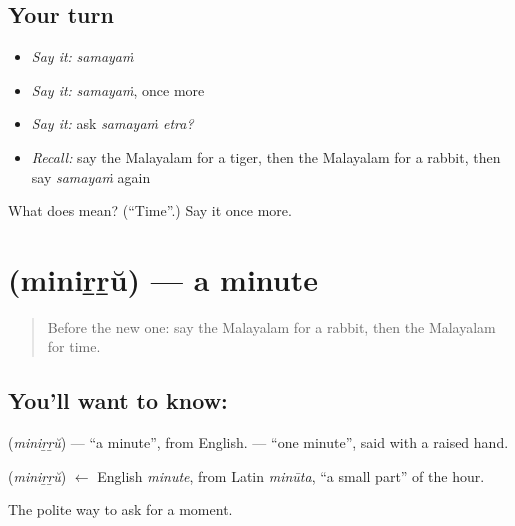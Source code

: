 \subsection*{Your turn}
\begin{itemize}
\raggedright
  \item \emph{Say it:} \emph{samayaṁ}
  \item \emph{Say it:} \emph{samayaṁ}, once more
  \item \emph{Say it:} ask \emph{samayaṁ etra?}
  \item \emph{Recall:} say the Malayalam for a tiger, then the Malayalam for a rabbit, then say \emph{samayaṁ} again
\end{itemize}

\begin{tcolorbox}[breakable,colback=teal!4,colframe=teal!35!black,title={Before you move on}]
What does  mean? (\textquotedblleft{}Time\textquotedblright{}.) Say it once more.
\end{tcolorbox}
\section[\texorpdfstring{\ml{മിനിറ്റ്} (miniṟṟŭ)}{മിനിറ്റ് (miniṟṟŭ)}]{ (miniṟṟŭ) — a minute}

\label{lesson:ML-C139-minute}



\begin{quote}
Before the new one: say the Malayalam for a rabbit, then the Malayalam for time.
\end{quote}

\subsection*{You'll want to know: }
\textbf{} (\emph{miniṟṟŭ}) — \textquotedblleft{}a minute\textquotedblright{}, from English. \textbf{ } — \textquotedblleft{}one minute\textquotedblright{}, said with a raised hand.

\begin{cousinweb}
\textbf{} (\emph{miniṟṟŭ}) $\leftarrow$ English \emph{minute}, from Latin \emph{minūta}, \textquotedblleft{}a small part\textquotedblright{} of the hour.
\end{cousinweb}

\begin{grammarlens}[title={What you've built}]
The polite way to ask for a moment.
\end{grammarlens}

